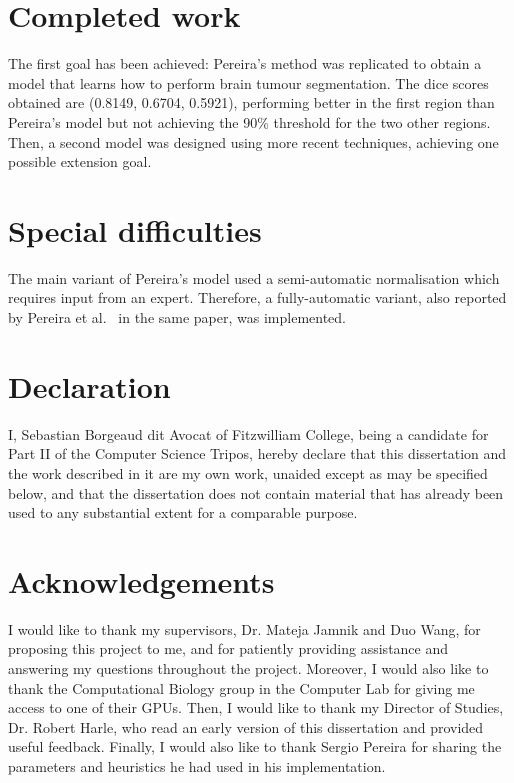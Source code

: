 \documentclass[12pt,a4paper,twoside,openright]{report}
\begin{document}
\section*{Completed work}
The first goal has been achieved: Pereira's method was replicated to obtain a model that learns how to perform brain tumour segmentation. The dice scores obtained are (0.8149, 0.6704, 0.5921), performing better in the first region than Pereira's model but not achieving the 90\% threshold for the two other regions. Then, a second model was designed using more recent techniques, achieving one possible extension goal.

\section*{Special difficulties}
The main variant of Pereira's model used a semi-automatic normalisation which requires input from an expert. Therefore, a fully-automatic variant, also reported by Pereira et al.\ \cite{pereira} in the same paper, was implemented.
\newpage
\section*{Declaration}

I, Sebastian Borgeaud dit Avocat of Fitzwilliam College, being a candidate for Part II of the Computer Science Tripos, hereby declare
that this dissertation and the work described in it are my own work,
unaided except as may be specified below, and that the dissertation
does not contain material that has already been used to any substantial
extent for a comparable purpose.

\bigskip
{}

\medskip
{}

\tableofcontents

\listoffigures

\newpage

\setlength{\parskip}{1em} %

\section*{Acknowledgements}
I would like to thank my supervisors, Dr. Mateja Jamnik and Duo Wang, for proposing this project to me, and for patiently providing assistance and answering my questions throughout the project. Moreover, I would also like to thank the Computational Biology group in the Computer Lab for giving me access to one of their GPUs. Then, I would like to thank my Director of Studies, Dr. Robert Harle, who read an early version of this dissertation and provided useful feedback. Finally, I would also like to thank Sergio Pereira for sharing the parameters and heuristics he had used in his implementation.
\end{document}
